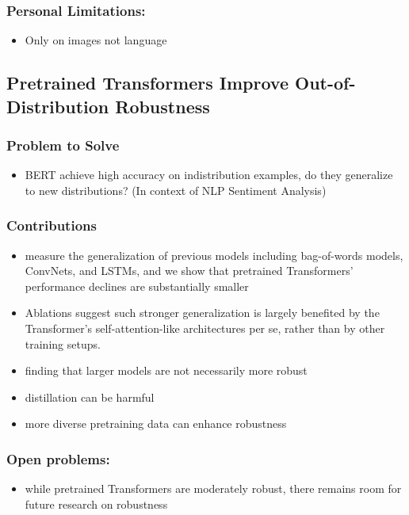 \documentclass{article}
\begin{document}
\begin{flushleft}
\subsubsection*{Personal Limitations:}
\begin{itemize}
  \item Only on images not language
\end{itemize}




 
 \subsection{Pretrained Transformers Improve Out-of-Distribution Robustness\cite{}} 
\subsubsection*{Problem to Solve}
\begin{itemize}
    \item BERT achieve high accuracy on indistribution examples, do they generalize to new distributions? (In context of NLP Sentiment Analysis)
\end{itemize}

\subsubsection*{Contributions}
\begin{itemize}
 \item measure the generalization of previous models including bag-of-words models, ConvNets, and LSTMs, and we show
that pretrained Transformers’ performance declines are substantially smaller 
\item Ablations suggest such stronger generalization is largely benefited by the Transformer’s self-attention-like architectures per se, rather than by other training setups.
 \item finding that larger models are not necessarily more robust
 \item distillation can be harmful
 \item more diverse pretraining data can enhance robustness
\end{itemize}

\subsubsection*{Open problems:}
\begin{itemize}
  \item while pretrained Transformers are moderately robust, there remains room for future research on robustness
\end{itemize}








\nocite{*}



\end{flushleft}
 
\end{document}
